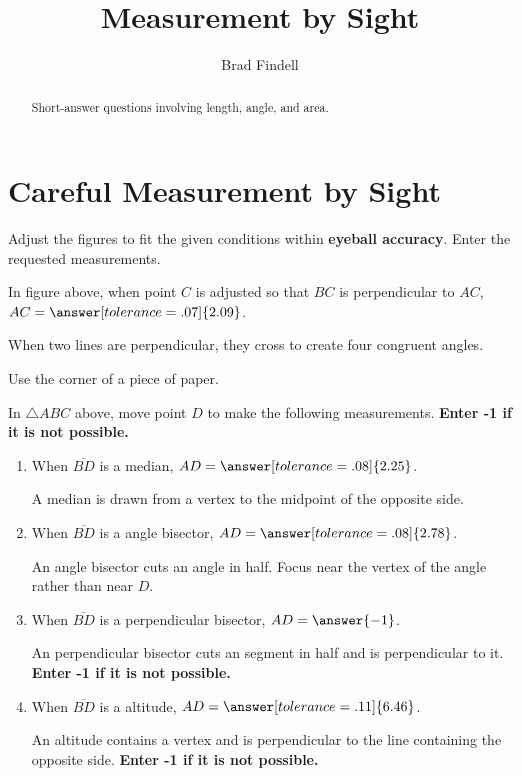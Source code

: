 \documentclass[nooutcomes]{ximera}
\title{Measurement by Sight}
\author{Brad Findell}
\begin{document}
\begin{abstract}
Short-answer questions involving length, angle, and area. 
\end{abstract}
\maketitle

\section{Careful Measurement by Sight}
Adjust the figures to fit the given conditions within \textbf{eyeball accuracy}.  Enter the requested measurements.  

\begin{problem}
\begin{center}  
\end{center}
In figure above, when point $C$ is adjusted so that $BC$ is perpendicular to $AC$, $AC=\answer[tolerance=.07]{2.09}$.
\begin{hint}
When two lines are perpendicular, they cross to create four congruent angles. 
\end{hint}
\begin{hint}
Use the corner of a piece of paper.
\end{hint}
\end{problem}


\begin{problem}
\begin{center}  
\end{center}
In $\triangle ABC$ above, move point $D$ to make the following measurements.  \textbf{Enter -1 if it is not possible.}   
\begin{enumerate}
\item When $\overline{BD}$ is a median, $AD=\answer[tolerance=.08]{2.25}$.
\begin{hint}
A median is drawn from a vertex to the midpoint of the opposite side.
\end{hint}
\item When $\overline{BD}$ is a angle bisector, $AD=\answer[tolerance=.08]{2.78}$.
\begin{hint}
An angle bisector cuts an angle in half.  Focus near the vertex of the angle rather than near $D$.
\end{hint}
\item When $\overline{BD}$ is a perpendicular bisector, $AD=\answer{-1}$.
\begin{hint}
An perpendicular bisector cuts an segment in half and is perpendicular to it. \textbf{Enter -1 if it is not possible.} 
\end{hint}
\item When $\overline{BD}$ is a altitude, $AD=\answer[tolerance=.11]{6.46}$.
\begin{hint}
An altitude contains a vertex and is perpendicular to the line containing the opposite side. \textbf{Enter -1 if it is not possible.} 
\end{hint}
\end{enumerate}
\end{problem}
\end{document}
